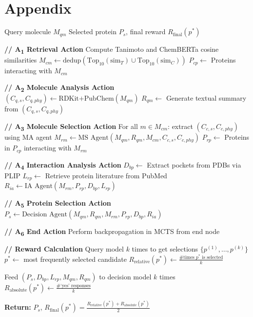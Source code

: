 \documentclass[letterpaper,twocolumn,10pt]{llncs}
\begin{document}
\section{Appendix}
{\footnotesize
\begin{algorithm}[!ht]
\caption{A single MCTS rollout within the DrugMCTS framework.}
\label{alg:drugmcts}
\begin{algorithmic}[1]
\Require Query molecule $M_{qm}$
\Ensure Selected protein $P_s$, final reward $R_{\text{final}}(p^*)$

\State \textbf{// A\textsubscript{1} Retrieval Action}
\State Compute Tanimoto and ChemBERTa cosine similarities
\State $M_{cm} \gets \text{dedup}(\text{Top}_{10}(\text{sim}_T) \cup \text{Top}_{10}(\text{sim}_C))$
\State $P_{cp} \gets$ Proteins interacting with $M_{cm}$

\State \textbf{// A\textsubscript{2} Molecule Analysis Action}
\State $(C_{q,s}, C_{q,phy}) \gets \text{RDKit+PubChem}(M_{qm})$
\State $R_{qm} \gets$ Generate textual summary from $(C_{q,s}, C_{q,phy})$

\State \textbf{// A\textsubscript{3} Molecule Selection Action}
\State For all $m \in M_{cm}$: extract $(C_{c,s}, C_{c,phy})$ using MA agent
\State $M_{rm} \gets \text{MS Agent}(M_{qm}, R_{qm}, M_{cm}, C_{c,s}, C_{c,phy})$
\State $P_{rp} \gets$ Proteins in $P_{cp}$ interacting with $M_{rm}$

\State \textbf{// A\textsubscript{4} Interaction Analysis Action}
\State $D_{bp} \gets$ Extract pockets from PDBs via PLIP
\State $L_{rp} \gets$ Retrieve protein literature from PubMed
\State $R_{ia} \gets \text{IA Agent}(M_{rm}, P_{rp}, D_{bp}, L_{rp})$

\State \textbf{// A\textsubscript{5} Protein Selection Action}
\State $P_s \gets \text{Decision Agent}(M_{qm}, R_{qm}, M_{rm}, P_{rp}, D_{bp}, R_{ia})$

\State \textbf{// A\textsubscript{6} End Action}
\State Perform backpropagation in MCTS from end node

\State \textbf{// Reward Calculation}
\State Query model $k$ times to get selections $\{p^{(1)}, \dots, p^{(k)}\}$
\State $p^* \gets$ most frequently selected candidate
\State $R_{\text{relative}}(p^*) \gets \frac{\#\text{times } p^* \text{ is selected}}{k}$

\State Feed $(P_s, D_{bp}, L_{rp}, M_{qm}, R_{qm})$ to decision model $k$ times
\State $R_{\text{absolute}}(p^*) \gets \frac{\#\text{‘yes’ responses}}{k}$

\State \textbf{Return:} $P_s$, $R_{\text{final}}(p^*) = \frac{R_{\text{relative}}(p^*) + R_{\text{absolute}}(p^*)}{2}$

\end{algorithmic}
\end{algorithm}
}
\end{document}
